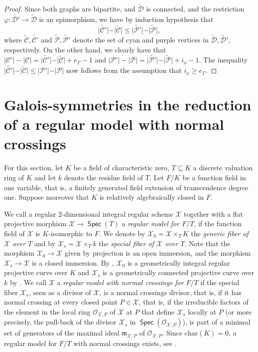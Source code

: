\documentclass[a4paper,12pt,reqno]{amsart}
\newcommand\mc\mathcal
\newcommand{\wt}{\widetilde}
\theoremstyle{definition}
\numberwithin{equation}{thm}
\renewcommand{\leq}{\leqslant}
\renewcommand{\geq}{\geqslant}
\DeclareMathOperator{\Spec}{\mathsf{Spec}}
\begin{document}
\begin{proof}
Since both graphs are bipartite, and $\wt{\mc{D}}$ is connected, and the restriction 
$\varphi: \wt{\mc{D}'} \to \wt{\mc{D}}$ is an epimorphism, we have by induction hypothesis that
$$\vert \wt{\mc{C}'}\vert - \vert \wt{\mc{C}} \vert \leq \vert \wt{\mc{P}'}\vert - \vert \wt{\mc{P}}\vert,$$ where $\wt{\mc{C}}, \wt{\mc{C}'}$ and $\wt{\mc{P}}, \wt{\mc{P}'}$ denote the set of cyan and purple vertices in $\wt{\mc{D}}, \wt{\mc{D}'}$, respectively.
On the other hand, we clearly have that
$|\mc{C}'|-|\mc{C}| = \vert \wt{\mc{C}'}\vert - \vert \wt{\mc{C}} \vert + e_\Gamma - 1$
and 
$|\mc{P}'|-|\mc{P}| = \vert \wt{\mc{P}'}\vert - \vert \wt{\mc{P}} \vert + i_x - 1$. The inequality $\vert \wt{\mc{C}'}\vert - \vert \wt{\mc{C}} \vert \leq \vert \mc{P}'\vert - \vert \mc{P}\vert$ now follows from the assumption that $i_x \geq e_\Gamma$.
\end{proof}






\section{Galois-symmetries in the reduction of a regular model with normal crossings}\label{dualgraphsection}

For this section, let $K$ be a field of characteristic zero, $T \subseteq K$ a discrete valuation ring of $K$ and let $k$ denote the residue field of $T$. Let $F/K$ be a function field in one variable, that is, a finitely generated field extension of transcendence degree one. Suppose moreover that $K$ is relatively algebraically closed in $F$. 





We call a regular $2$-dimensional integral regular scheme $\mc{X}$ together with a flat projective morphism $\mc{X} \to \Spec(T)$ a \textit{regular model for $F/T$}, if the function field of $\mc{X}$ is $K$-isomorphic to $F$.
We denote by  $\mc{X}_0=\mc{X} \times_T K$ the \textit{generic fiber of $\mc{X}$ over $T$} and by $\mc{X}_s=\mc{X} \times_T k$ the \textit{special fiber of $\mc{X}$ over $T$}. Note that the morphism $\mc{X}_0 \to \mc{X}$ given by projection is an open immersion, and the morphism $\mc{X}_s \to \mc{X}$ is a closed immersion.
By \cite[Lemma~3.2.14]{Liu}, $\mc{X}_0$ is a geometrically integral regular projective curve over $K$ and $\mc{X}_s$ is a geometrically connected projective curve over $k$ by \cite[Corollary 8.3.6]{Liu}.
 We call $\mc{X}$ a \textit{regular model with normal crossings for $F/T$} if the special fiber $\mc{X}_s$, seen as a divisor of $\mc{X}$, is a normal crossings divisor, that is, if it has normal crossing at every closed point $P \in \mc{X}$, that is, if
the irreducible factors of the element in the local ring $\mathcal{O}_{\mc{X},P}$ of $\mc{X}$ at $P$ that define $\mc{X}_s$ locally at $P$ (or more precisely, the pull-back of the divisor $\mc{X}_s$ in $\Spec(\mathcal{O}_{\mc{X},P})$), is part of a minimal set of generators of the maximal ideal $\mathfrak{m}_{\mc{X},P}$ of $\mathcal{O}_{\mc{X},P}$.
Since $\mathrm{char}(K)=0$, a regular model for $F/T$ with normal crossings exists, see \cite[Proposition 10.1.8]{Liu}.
\end{document}
